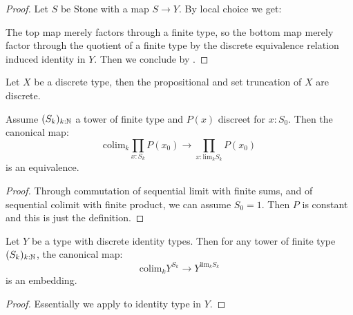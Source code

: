\begin{proof}
Let $S$ be Stone with a map $S\to Y$. By local choice we get:
 \begin{center}
\end{center}
The top map merely factors through a finite type, so the bottom map merely factor through the quotient of a finite type by the discrete equivalence relation induced identity in $Y$. Then we conclude by .
\end{proof}

\begin{corollary}\label{prop-set-truncation-discrete}
Let $X$ be a discrete type, then the propositional and set truncation of $X$ are discrete.
\end{corollary}

\begin{lemma}\label{discrete-continuity-dependent}
Assume $(S_k)_{k:\mathbb{N}}$ a tower of finite type and $P(x)$ discreet for $x:S_0$. Then the canonical map:
\[\mathrm{colim}_k\prod_{x:S_k}P(x_0) \to \prod_{x:\mathrm{lim}_kS_k}P(x_0)\]
is an equivalence.
\end{lemma}

\begin{proof}
Through commutation of sequential limit with finite sums, and of sequential colimit with finite product, we can assume $S_0 = 1$. Then $P$ is constant and this is just the definition.
\end{proof}

\begin{lemma}\label{discrete-identity-embedding}
Let $Y$ be a type with discrete identity types. Then for any tower of finite type $(S_k)_{k:\mathbb{N}}$, the canonical map:
\[\mathrm{colim}_kY^{S_k} \to Y^{\mathrm{lim}_kS_k}\]
is an embedding.
\end{lemma}

\begin{proof}
Essentially we apply  to identity type in $Y$. 
\end{proof}


